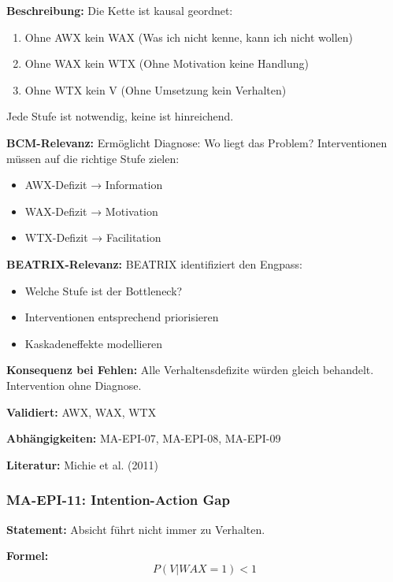 \textbf{Beschreibung:}
Die Kette ist kausal geordnet:
\begin{enumerate}
    \item Ohne AWX kein WAX (Was ich nicht kenne, kann ich nicht wollen)
    \item Ohne WAX kein WTX (Ohne Motivation keine Handlung)
    \item Ohne WTX kein V (Ohne Umsetzung kein Verhalten)
\end{enumerate}
Jede Stufe ist notwendig, keine ist hinreichend.

\textbf{BCM-Relevanz:}
Ermöglicht Diagnose: Wo liegt das Problem? Interventionen müssen auf die richtige Stufe zielen:
\begin{itemize}
    \item AWX-Defizit → Information
    \item WAX-Defizit → Motivation
    \item WTX-Defizit → Facilitation
\end{itemize}

\textbf{BEATRIX-Relevanz:}
BEATRIX identifiziert den Engpass:
\begin{itemize}
    \item Welche Stufe ist der Bottleneck?
    \item Interventionen entsprechend priorisieren
    \item Kaskadeneffekte modellieren
\end{itemize}

\textbf{Konsequenz bei Fehlen:}
Alle Verhaltensdefizite würden gleich behandelt. Intervention ohne Diagnose.

\textbf{Validiert:} AWX, WAX, WTX

\textbf{Abhängigkeiten:} MA-EPI-07, MA-EPI-08, MA-EPI-09

\textbf{Literatur:} Michie et al. (2011)


\subsubsection*{MA-EPI-11: Intention-Action Gap}

\textbf{Statement:} Absicht führt nicht immer zu Verhalten.

\textbf{Formel:}
\begin{equation}
P(V|WAX=1) < 1
\end{equation}

